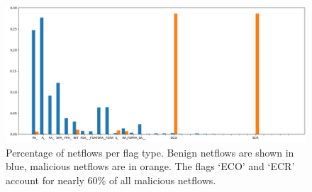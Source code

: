 \documentclass[]{article}
\begin{document}
\begin{figure}[H]
\begin{center}
\includegraphics[scale=0.4]{scenario10_flags.png}
\caption{Percentage of netflows per flag type. Benign netflows are shown in blue, malicious netflows are in orange. The flags `ECO' and `ECR' account for nearly 60\% of all malicious netflows.}
\label{flags}
\end{center}
\end{figure}
\end{document}

